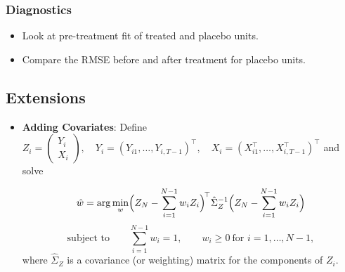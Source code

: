 \documentclass[11pt]{exam}
\begin{document}
\subsubsection{Diagnostics}
\begin{itemize}
    \item Look at pre-treatment fit of treated and placebo units.
    \item Compare the RMSE before and after treatment for placebo units.
\end{itemize}





\subsection{Extensions}
\begin{itemize}
    \item \textbf{Adding Covariates}: Define $  Z_i = \begin{pmatrix} Y_i \\[0.2em] X_i \end{pmatrix},
      \quad
      Y_i = (Y_{i1},\dots,Y_{i,T-1})^\top,
      \quad
      X_i = (X_{i1}^\top,\dots,X_{i,T-1}^\top)^\top $ and solve

  \[
    \hat w
    =
    \arg\min_{w}
    \Bigl(
      Z_N - \sum_{i=1}^{N-1} w_i Z_i
    \Bigr)^{\!\top}
    \hat \Sigma_Z^{-1}
    \Bigl(
      Z_N - \sum_{i=1}^{N-1} w_i Z_i
    \Bigr)
  \]
  \[
    \text{subject to}\qquad
    \sum_{i=1}^{N-1} w_i = 1,
    \qquad
    w_i \ge 0 \ \text{for } i=1,\dots,N-1,
  \]
  where $\hat \Sigma_Z$ is a covariance (or weighting) matrix for the components of
  $Z_i$.


\end{itemize}
\end{document}
